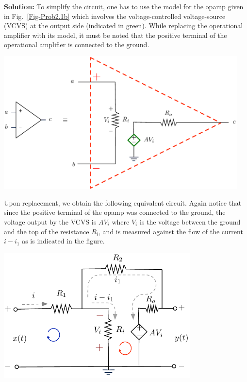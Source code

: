 \documentclass[11pt,a4paper]{book}
\theoremstyle{plain}
\numberwithin{equation}{section}
\newenvironment{solution}{\begin{footnotesize}\textbf{Solution:}}{\end{footnotesize}}
\newenvironment{excersizelist}{%
  \renewcommand*{\theenumi}{\thechapter.\arabic{enumi}}%
  \newcommand\itemadvanced{\stepcounter{enumi}\item[$\ast$\, \theenumi.]}
  \begin{enumerate}
}{%
  \end{enumerate}
}
\begin{document}
\begin{excersizelist}
\begin{solution}
To simplify the circuit, one has to use the model for the opamp given in Fig.~\ref{Fig-Prob2.1b} which involves the voltage-controlled voltage-source (VCVS) at the output side (indicated in green).  While replacing the operational amplifier with its model, it must be noted that the positive terminal of the operational amplifier is connected to the ground.

{
\centering 
\captionsetup{type=figure}
\includegraphics[width=5in]{plots/multiplierbadri2.pdf}
 \label{Fig-Prob2.1b}
}

Upon replacement, we obtain the following equivalent circuit. Again notice that since the positive terminal of the opamp was connected to the ground, the voltage output by the VCVS is $AV_i$ where $V_i$ is the voltage between the ground and the top of the resistance $R_i$, and is measured against the flow of the current $i-i_1$ as is indicated in the figure.

{
\centering 
\captionsetup{type=figure}
\includegraphics[width=4in]{plots/multiplierbadri3.pdf}
 \label{Fig-Prob2.1c}
}


\end{solution}
\end{excersizelist}
\end{document}
